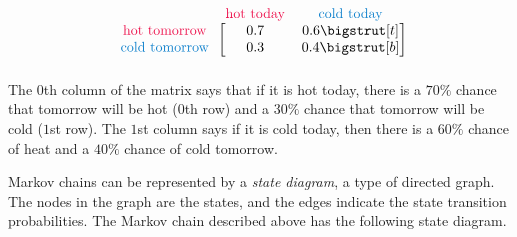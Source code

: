 \begin{align*}
\begin{blockarray}{ccc}
& \text{\textcolor{red}{hot today}} & \text{\textcolor{blue}{cold today}} \\
\begin{block}{c[cc]}
\text{\textcolor{red}{hot tomorrow}}   & 0.7 & 0.6 \topstrut \\
\text{\textcolor{blue}{cold tomorrow}} & 0.3 & 0.4 \botstrut \\
\end{block}\end{blockarray}
\end{align*}
%
The $0$th column of the matrix says that if it is hot today, there is a $70\%$ chance that tomorrow will be hot ($0$th row) and a $30\%$ chance that tomorrow will be cold ($1$st row).
The $1$st column says if it is cold today, then there is a $60\%$ chance of heat and a $40\%$ chance of cold tomorrow.

Markov chains can be represented by a \emph{state diagram}, a type of directed graph.
The nodes in the graph are the states, and the edges indicate the state transition probabilities.
The Markov chain described above has the following state diagram.

\begin{figure}[H] %
\centering
{}
\end{figure}


